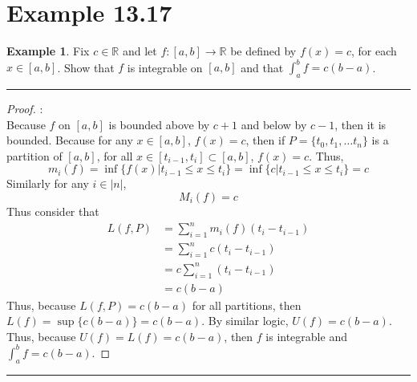 \documentclass[openany, amssymb, psamsfonts]{amsart}
\newcommand{\bbR}{\mathbb{R}}
\theoremstyle{definition}
\newtheorem{exmp}{Example}[section]
\numberwithin{equation}{section}
\begin{document}
\section*{Example 13.17}
\begin{exmp}
\label{13.17}
	Fix $c\in\bbR$ and let $f\colon [a, b] \to \bbR$ be defined by $f(x) = c$, for each $x \in [a, b]$. Show that $f$ is integrable on $[a, b]$ and that $\int_a^b f = c(b-a)$.
\end{exmp}
\vspace{4pt}     \hrule   \vspace{4pt}\begin{proof}:\\
Because $f$ on $[a,b]$ is bounded above by $c+1$ and below by $c-1$, then it is bounded. Because for any $x\in [a,b]$, $f(x) = c$, then if $P = \{t_0, t_1, \dots t_n\}$ is a partition of $[a,b]$, for all $x\in [t_{i-1}, t_i] \subset [a,b]$, $f(x) = c$. Thus, \[m_i(f) = \inf\{f(x) | t_{i-1}\leq x \leq t_i\} = \inf\{c | t_{i-1}\leq x \leq t_i\} = c\] Similarly for any $i\in |n|$, \[M_i(f) = c\] Thus consider that 
\begin{align*}
    L(f,P) &= \sum_{i=1}^nm_i(f)(t_{i}- t_{i-1})\\
    &= \sum_{i=1}^nc(t_{i}- t_{i-1})\\
    &= c\sum_{i=1}^n(t_{i}- t_{i-1})\\
    &= c(b-a)
    \end{align*}
Thus, because $L(f,P) = c(b-a)$ for all partitions, then $L(f) = \sup\{c(b-a)\} = c(b-a)$. By similar logic, $U(f) = c(b-a)$. Thus, because $U(f) = L(f) = c(b-a)$, then $f$ is integrable and $\int_a^bf = c(b-a)$.
    
\end{proof}\vspace{4pt}     \hrule   \vspace{4pt}
\end{document}
